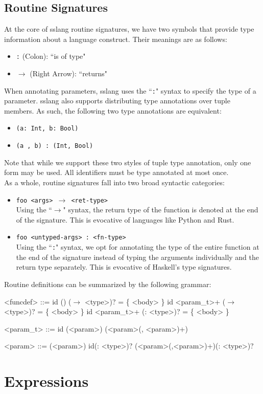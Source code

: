 \documentclass{article}
\begin{document}
\subsection{Routine Signatures}
\noindent At the core of sslang routine signatures, we have two symbols that provide type information about a language construct. Their meanings are as follows:
\begin{itemize}
    \item \texttt{:} (Colon): ``is of type"
    \item \texttt{$\rightarrow$} (Right Arrow): ``returns"
\end{itemize}

\noindent When annotating parameters, sslang uses the ``\texttt{:}" syntax to specify the type of a parameter. sslang also supports distributing type annotations over tuple members. As such, the following two type annotations are equivalent:
\begin{itemize}
    \item \texttt{(a: Int, b: Bool)}
    \item \texttt{(a , b) : (Int, Bool)}
\end{itemize}

\noindent Note that while we support these two styles of tuple type annotation, only one form may be used. All identifiers must be type annotated at most once. \\

\noindent As a whole, routine signatures fall into two broad syntactic categories:
\begin{itemize}
    \item \texttt{foo <args> $\rightarrow$ <ret-type>}\\
          Using the ``\texttt{$\rightarrow$}" syntax, the return type of the function is denoted at the end of the signature. This is evocative of languages like Python and Rust.
    \item \texttt{foo <untyped-args> : <fn-type>}\\
          Using the ``\texttt{:}" syntax, we opt for annotating the type of the entire function at the end of the signature instead of typing the arguments individually and the return type separately. This is evocative of Haskell's type signatures.
\end{itemize}

\noindent Routine definitions can be summarized by the following grammar:
\setlength{\grammarindent}{5em}
\begin{grammar}
<funcdef> ::= id () ($\rightarrow$ <type>)? = \{ <body> \}
\alt id <param_t>+ ($\rightarrow$ <type>)? = \{ <body> \}
\alt id <param_t>+ (: <type>)? = \{ <body> \}

<param_t> ::= id
\alt (<param>)
\alt (<param>(, <param>)+)

<param> ::= (<param>)
\alt id(: <type>)?
\alt (<param>(,<param>)+)(: <type>)?
\end{grammar}

\section{Expressions}
\end{document}
